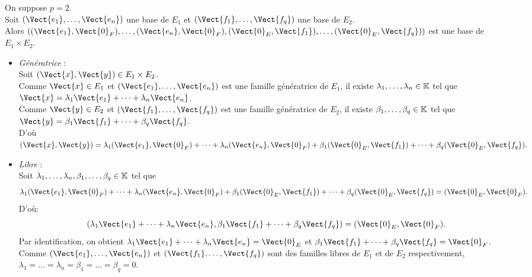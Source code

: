\documentclass{book}
\begin{document}
\begin{Demonstration}
On suppose $p=2$.\\
Soit $(\Vect{e_1},\dots,\Vect{e_n})$ une base de $E_1$ et $(\Vect{f_1},\dots,\Vect{f_q})$ une base de $E_2$.\\
Alors $( (\Vect{e_1},\Vect{0}_F),\dots,(\Vect{e_n},\Vect{0}_F),(\Vect{0}_E,\Vect{f_1}),\dots,(\Vect{0}_E,\Vect{f_q}))$ est une base de $E_1\times E_2.$
\begin{itemize}
\item \textit{Génératrice} :\\
Soit $(\Vect{x},\Vect{y})\in E_1\times E_2$. \\
Comme $\Vect{x}\in E_1$ et $(\Vect{e_1},\dots,\Vect{e_n})$ est une famille génératrice de $E_1$, il existe $\lambda_1,\dots,\lambda_n\in \mathbb{K}$ tel que $\Vect{x}=\lambda_1\Vect{e_1}+\dots+ \lambda_n\Vect{e_n}$.\\
Comme $\Vect{y}\in E_2$ et $(\Vect{f_1},\dots,\Vect{f_q})$ est une famille génératrice de $E_2$, il existe $\beta_1,\dots,\beta_q\in \mathbb{K}$ tel que $\Vect{y}=\beta_1\Vect{f_1}+\dots+ \beta_q\Vect{f_q}$.\\
D'où $(\Vect{x},\Vect{y})=\lambda_1(\Vect{e_1},\Vect{0}_F)+\dots+\lambda_n(\Vect{e_n},\Vect{0}_F)+ \beta_1(\Vect{0}_E,\Vect{f_1})+\dots+\beta_q(\Vect{0}_E,\Vect{f_q}).$
\item \textit{Libre} :\\
Soit  $\lambda_1,\dots,\lambda_n,\beta_1,\dots,\beta_q\in \mathbb{K}$ tel que $$\lambda_1(\Vect{e_1},\Vect{0}_F)+\dots+\lambda_n(\Vect{e_n},\Vect{0}_F)+ \beta_1(\Vect{0}_E,\Vect{f_1})+\dots+\beta_q(\Vect{0}_E,\Vect{f_q})=(\Vect{0}_E,\Vect{0}_F).$$
D'où:
$$(\lambda_1\Vect{e_1}+\dots+ \lambda_n\Vect{e_n},\beta_1\Vect{f_1}+\dots+ \beta_q\Vect{f_q} )=(\Vect{0}_E,\Vect{0}_F).$$
Par identification, on obtient $\lambda_1\Vect{e_1}+\dots+ \lambda_n\Vect{e_n}=\Vect{0}_E$ et $\beta_1\Vect{f_1}+\dots+ \beta_q\Vect{f_q}=\Vect{0}_F$. Comme $(\Vect{e_1},\dots,\Vect{e_n})$ et $(\Vect{f_1},\dots,\Vect{f_q})$ sont des familles libres de $E_1$ et  de $E_2$ respectivement, $\lambda_1=\dots=\lambda_n=\beta_1=\dots=\beta_q=0$. 
\end{itemize}
\end{Demonstration}
\end{document}
